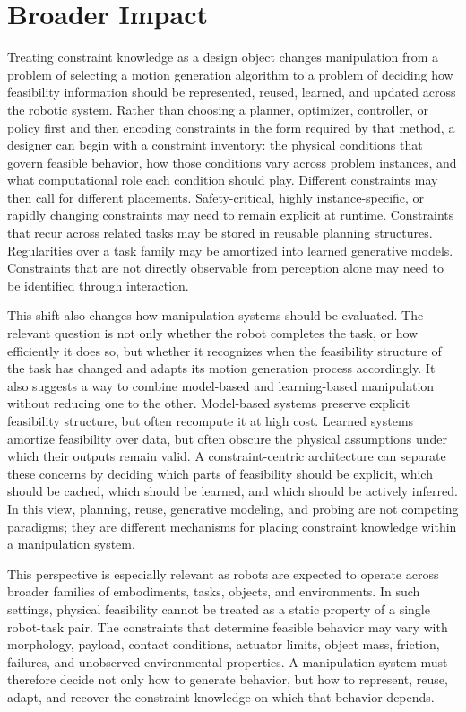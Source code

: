 \section{Broader Impact}
\label{sec:discussion:closing}
Treating constraint knowledge as a design object changes manipulation from a problem of selecting a motion generation algorithm to a problem of deciding how feasibility information should be represented, reused, learned, and updated across the robotic system.
Rather than choosing a planner, optimizer, controller, or policy first and then encoding constraints in the form required by that method, a designer can begin with a constraint inventory: the physical conditions that govern feasible behavior, how those conditions vary across problem instances, and what computational role each condition should play.
Different constraints may then call for different placements.
Safety-critical, highly instance-specific, or rapidly changing constraints may need to remain explicit at runtime.
Constraints that recur across related tasks may be stored in reusable planning structures.
Regularities over a task family may be amortized into learned generative models.
Constraints that are not directly observable from perception alone may need to be identified through interaction.

This shift also changes how manipulation systems should be evaluated.
The relevant question is not only whether the robot completes the task, or how efficiently it does so, but whether it recognizes when the feasibility structure of the task has changed and adapts its motion generation process accordingly.
It also suggests a way to combine model-based and learning-based manipulation without reducing one to the other.
Model-based systems preserve explicit feasibility structure, but often recompute it at high cost.
Learned systems amortize feasibility over data, but often obscure the physical assumptions under which their outputs remain valid.
A constraint-centric architecture can separate these concerns by deciding which parts of feasibility should be explicit, which should be cached, which should be learned, and which should be actively inferred.
In this view, planning, reuse, generative modeling, and probing are not competing paradigms; they are different mechanisms for placing constraint knowledge within a manipulation system.

This perspective is especially relevant as robots are expected to operate across broader families of embodiments, tasks, objects, and environments.
In such settings, physical feasibility cannot be treated as a static property of a single robot-task pair.
The constraints that determine feasible behavior may vary with morphology, payload, contact conditions, actuator limits, object mass, friction, failures, and unobserved environmental properties.
A manipulation system must therefore decide not only how to generate behavior, but how to represent, reuse, adapt, and recover the constraint knowledge on which that behavior depends.

